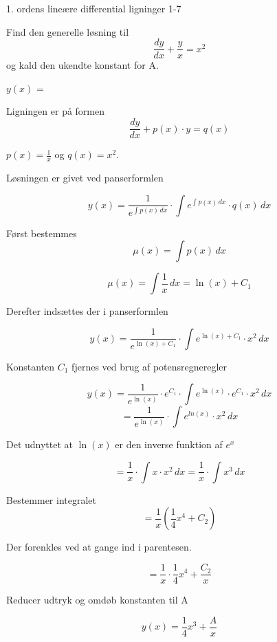 \documentclass{article}
\begin{document}
\newpage

\begin{exercise}{1. ordens lineære differential ligninger 1-7}


Find den generelle løsning til
\[
\frac{dy}{dx} + \frac{y}{x} = x^2
\]
og kald den ukendte konstant for A.

$y(x)$ = 



\hint

Ligningen er på formen
\[
\frac{dy}{dx} + p(x) \cdot y = q(x)
\]

\hint

$p(x)=\frac{1}{x}$ og $q(x)=x^2$.

\hint

Løsningen er givet ved panserformlen


\hint

\[
y(x) = \frac{1}{e^{\int p(x) \, dx}} \cdot \int e^{\int p(x) \, dx} \cdot q(x) \, dx
\]

\hint

Først bestemmes
\[
\mu(x) = \int p(x) \, dx
\]

\hint
\[
\mu(x) = \int \frac{1}{x} \, dx = \ln(x)+ C_1
\]

\hint
Derefter indsættes der i panserformlen

\hint

\[
y(x) = \frac{1}{e^{\ln(x) + C_1}} \cdot \int e^{\ln(x) + C_1} \cdot x^2 \, dx
\]


\hint

Konstanten $C_1$ fjernes ved brug af potensregneregler

\hint
\[
y(x) = \frac{1}{e^{\ln(x)}} \cdot e^{C_1} \cdot \int e^{\ln(x)} \cdot e^{C_1} \cdot x^2 \, dx
\]
\[
= \frac{1}{e^{\ln(x)}} \cdot \int e^{ln(x)} \cdot x^2 \, dx
\]

\hint

Det udnyttet at $\ln(x)$ er den inverse funktion af $e^x$


\hint
\[
= \frac{1}{x} \cdot \int x \cdot x^2 \, dx = \frac{1}{x} \cdot \int x^3 \, dx
\]

\hint

Bestemmer integralet
\[
= \frac{1}{x} \left( \frac{1}{4}x^4 + C_2 \right)
\]

\hint

Der forenkles ved at gange ind i parentesen.

\hint
\[
= \frac{1}{x} \cdot \frac{1}{4}x^4 + \frac{C_2}{x}
\]

\hint

Reducer udtryk og omdøb konstanten til A

\hint
\[
y(x) = \frac{1}{4}x^3 + \frac{A}{x}
\]


\end{exercise}
\end{document}
